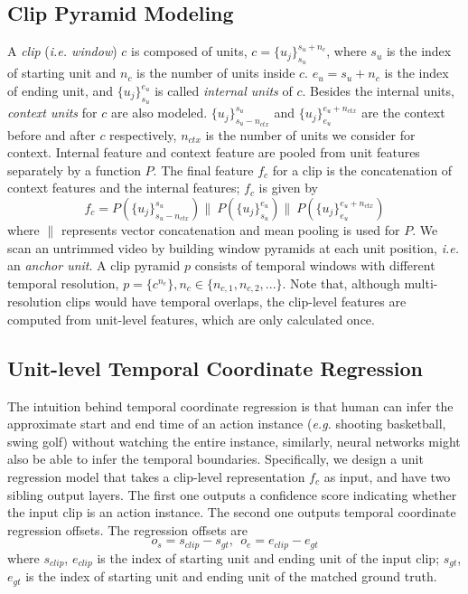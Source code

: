 \documentclass[10pt,twocolumn,letterpaper]{article}
\begin{document}
\subsection{Clip Pyramid Modeling}
A \emph{clip} (\emph{i.e. window}) $c$ is composed of units, $c=\{u_j\}_{s_u}^{s_u+n_c}$, where $s_u$ is the index of starting unit and $n_c$ is the number of units inside $c$. $e_u=s_u+n_c$ is the index of ending unit, and $\{u_j\}_{s_u}^{e_u}$ is called \emph{internal units} of $c$. Besides the internal units, \emph{context units} for $c$ are also modeled. $\{u_j\}_{s_u-n_{ctx}}^{s_u}$ and  $\{u_j\}_{e_u}^{e_u+n_{ctx}}$ are the context before and after $c$ respectively, $n_{ctx}$ is the number of units we consider for context. Internal feature and context feature are pooled from unit features separately by a function $P$. The final feature $f_c$ for a clip is the concatenation of context features and the internal features; $f_c$ is given by
\begin{equation*}
f_c=P(\{u_j\}_{s_u-n_{ctx}}^{s_u}) \parallel ~P(\{u_j\}_{s_u}^{e_u})\parallel ~P(\{u_j\}_{e_u}^{e_u+n_{ctx}})
\end{equation*}
where $\parallel$ represents vector concatenation and mean pooling is used for $P$. We scan an untrimmed video by building window pyramids at each unit position, \emph{i.e.} an \emph{anchor unit}. A clip pyramid $p$ consists of temporal windows with different temporal resolution, $p=\{c^{n_c}\}, n_c\in\{n_{c,1},n_{c,2},...\}$. Note that, although multi-resolution clips would have temporal overlaps, the clip-level features are computed from unit-level features, which are only calculated once. 

\subsection{Unit-level Temporal Coordinate Regression}
The intuition behind temporal coordinate regression is that human can infer the approximate start and end time of an action instance (\emph{e.g.} shooting basketball, swing golf) without watching the entire instance, similarly, neural networks might also be able to infer the temporal boundaries. Specifically, we design a unit regression model that takes a clip-level representation $f_c$ as input, and have two sibling output layers. The first one outputs a confidence score indicating whether the input clip is an action instance. The second one outputs temporal coordinate regression offsets. The regression offsets are
\begin{equation}
o_s=s_{clip}-s_{gt}, ~~ o_e=e_{clip}-e_{gt}
\end{equation}
where $s_{clip}$, $e_{clip}$ is the index of starting unit and ending unit of the input clip; $s_{gt}$, $e_{gt}$ is the index of starting unit and ending unit of the matched ground truth.
\end{document}
